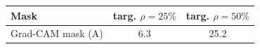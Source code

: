 \begin{tabular}{lcc}
\toprule
Mask & targ. $\rho=25\%$ & targ. $\rho=50\%$ \\
\midrule
Grad-CAM mask (A) & 6.3 & 25.2 \\
\bottomrule
\end{tabular}
